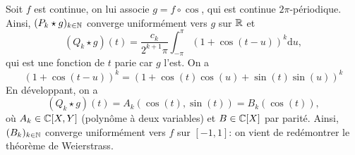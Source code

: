 \documentclass[12pt]{article}
\begin{document}
\begin{remark}
    Soit 
    $f$ est continue, on lui associe $g=f\circ \cos$, qui est continue $2\pi$-périodique. Ainsi, $(P_{k}\star g)_{k\in\mathbb{N}}$ converge uniformément vers $g$ sur $\mathbb{R}$ et 
    \begin{equation*}
        (Q_{k}\star g)(t)=\frac{c_{k}}{2^{k+1}\pi}\int_{-\pi}^{\pi}\left(1+\cos(t-u)\right)^{k}\mathrm{d}u,
    \end{equation*}
    qui est une fonction de $t$ parie car $g$ l'est. On a 
    \begin{equation*}
        (1+\cos(t-u))^{k}=\left(1+\cos(t)\cos(u)+\sin(t)\sin(u)\right)^{k}    
    \end{equation*}
    En développant, on a
    \begin{equation*}
        (Q_{k}\star g)(t)=A_{k}(\cos(t),\sin(t))=B_{k}(\cos(t)),
    \end{equation*}
    où $A_{k}\in\mathbb{C}[X,Y]$ (polynôme à deux variables) et $B\in\mathbb{C}[X]$ par parité. Ainsi, $(B_{k})_{k\in\mathbb{N}}$ converge uniformément vers $f$ sur $[-1,1]$: on vient de redémontrer le théorème de Weierstrass.
\end{remark}
\end{document}
